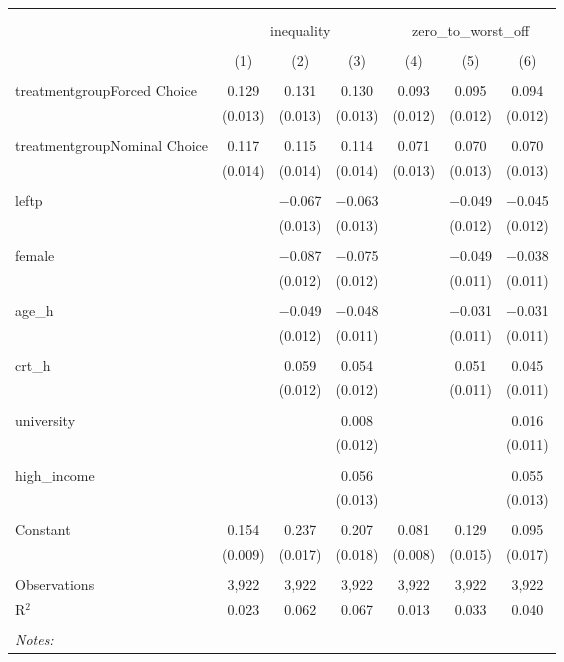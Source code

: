 
\begin{table}[!htbp] \centering 
  \caption{} 
  \label{} 
\begin{tabular}{@{\extracolsep{5pt}}lcccccc} 
\\[-1.8ex]\hline 
\hline \\[-1.8ex] 
\\[-1.8ex] & \multicolumn{3}{c}{inequality} & \multicolumn{3}{c}{zero\_to\_worst\_off} \\ 
\\[-1.8ex] & (1) & (2) & (3) & (4) & (5) & (6)\\ 
\hline \\[-1.8ex] 
 treatmentgroupForced Choice & 0.129 & 0.131 & 0.130 & 0.093 & 0.095 & 0.094 \\ 
  & (0.013) & (0.013) & (0.013) & (0.012) & (0.012) & (0.012) \\ 
  & & & & & & \\ 
 treatmentgroupNominal Choice & 0.117 & 0.115 & 0.114 & 0.071 & 0.070 & 0.070 \\ 
  & (0.014) & (0.014) & (0.014) & (0.013) & (0.013) & (0.013) \\ 
  & & & & & & \\ 
 leftp &  & $-$0.067 & $-$0.063 &  & $-$0.049 & $-$0.045 \\ 
  &  & (0.013) & (0.013) &  & (0.012) & (0.012) \\ 
  & & & & & & \\ 
 female &  & $-$0.087 & $-$0.075 &  & $-$0.049 & $-$0.038 \\ 
  &  & (0.012) & (0.012) &  & (0.011) & (0.011) \\ 
  & & & & & & \\ 
 age\_h &  & $-$0.049 & $-$0.048 &  & $-$0.031 & $-$0.031 \\ 
  &  & (0.012) & (0.011) &  & (0.011) & (0.011) \\ 
  & & & & & & \\ 
 crt\_h &  & 0.059 & 0.054 &  & 0.051 & 0.045 \\ 
  &  & (0.012) & (0.012) &  & (0.011) & (0.011) \\ 
  & & & & & & \\ 
 university &  &  & 0.008 &  &  & 0.016 \\ 
  &  &  & (0.012) &  &  & (0.011) \\ 
  & & & & & & \\ 
 high\_income &  &  & 0.056 &  &  & 0.055 \\ 
  &  &  & (0.013) &  &  & (0.013) \\ 
  & & & & & & \\ 
 Constant & 0.154 & 0.237 & 0.207 & 0.081 & 0.129 & 0.095 \\ 
  & (0.009) & (0.017) & (0.018) & (0.008) & (0.015) & (0.017) \\ 
  & & & & & & \\ 
Observations & 3,922 & 3,922 & 3,922 & 3,922 & 3,922 & 3,922 \\ 
R$^{2}$ & 0.023 & 0.062 & 0.067 & 0.013 & 0.033 & 0.040 \\ 
\hline \\[-1.8ex] 
\textit{Notes:} & \multicolumn{6}{l}{} \\ 
\end{tabular} 
\end{table} 
